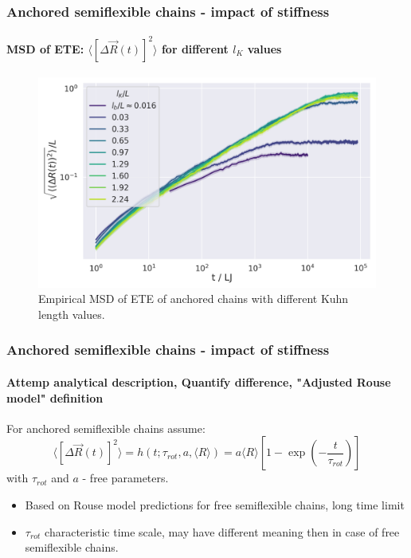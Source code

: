 \documentclass[handout]{beamer}
\newcommand{\mean}[1]{\langle #1 \rangle}
\newcommand{\E}[1]{\langle#1\rangle}
\begin{document}
\begin{frame}
    \frametitle{Anchored semiflexible chains - impact of stiffness}
    \framesubtitle{MSD of ETE: $\mean{[\Delta \vec{R}(t)]^2}$ for different $l_K$ values}

    \begin{figure}
        \centering
        \includegraphics[width=\columnwidth,trim={0cm 0cm 0cm 0.0cm},clip]{4-exp-delta_R-bare-log.png}
        \caption{Empirical MSD of ETE of anchored chains with different Kuhn length values.}
        \label{fig:msd_anchored_l_K}
    \end{figure}
\end{frame}


\begin{frame}
    \frametitle{Anchored semiflexible chains - impact of stiffness}
    \framesubtitle{Attemp analytical description, Quantify difference, "Adjusted Rouse model" definition}
    For anchored semiflexible chains assume:
    $$ \mean{[\Delta \vec{R}(t)]^2} = h(t; \tau_{rot}, a, \E{R}) = a \mean{R} [1 - \exp(-\frac{t}{\tau_{rot}})]$$
    with $\tau_{rot}$ and $a$ - free parameters.
    \begin{itemize}
        \item Based on Rouse model predictions for free semiflexible chains, 
        long time limit
        \item $\tau_{rot}$ characteristic time scale, may have different meaning
        then in case of free semiflexible chains.
    \end{itemize}
\end{frame}
\end{document}
